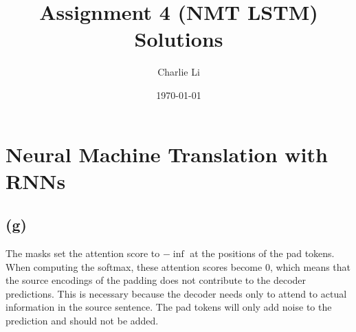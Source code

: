\documentclass[11pt]{article}
\title{Assignment 4 (NMT LSTM) Solutions}
\author{Charlie Li}
\date{\today}
\begin{document}
\maketitle

\section{Neural Machine Translation with RNNs}
\subsection*{(g)}
  The masks set the attention score to $-\inf$ at the positions of the pad tokens. When computing the softmax, these attention scores become 0, which means that the source encodings of the padding does not contribute to the decoder predictions. This is necessary because the decoder needs only to attend to actual information in the source sentence. The pad tokens will only add noise to the prediction and should not be added.
\end{document}
